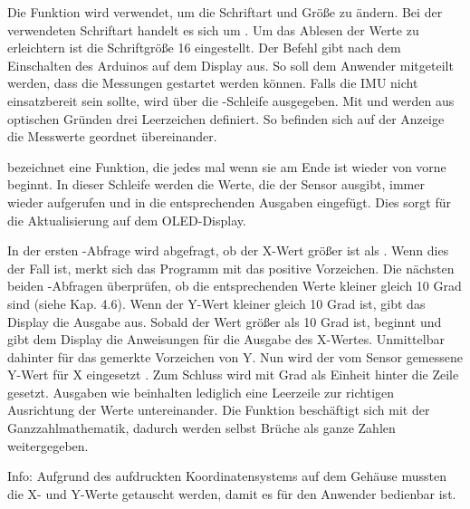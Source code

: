 Die Funktion  wird verwendet, um die Schriftart und Größe zu ändern. Bei der verwendeten Schriftart handelt es sich um . Um das Ablesen der Werte zu erleichtern ist die Schriftgröße 16 eingestellt. Der Befehl  gibt nach dem Einschalten des Arduinos auf dem Display  aus. So soll dem Anwender mitgeteilt werden, dass die Messungen gestartet werden können. Falls die IMU nicht einsatzbereit sein sollte, wird über die -Schleife  ausgegeben. Mit  und  werden aus optischen Gründen drei Leerzeichen definiert. So befinden sich auf der Anzeige die Messwerte geordnet übereinander.



  bezeichnet eine Funktion, die jedes mal wenn sie am Ende ist wieder von vorne beginnt. In dieser Schleife werden die Werte, die der Sensor ausgibt, immer wieder aufgerufen und in die entsprechenden Ausgaben eingefügt. Dies sorgt für die Aktualisierung auf dem OLED-Display. 

In der ersten -Abfrage wird abgefragt, ob der X-Wert größer ist als . Wenn dies der Fall ist, merkt sich das Programm mit  das positive Vorzeichen. Die nächsten beiden -Abfragen überprüfen, ob die entsprechenden Werte kleiner gleich 10 Grad sind (siehe Kap. 4.6). Wenn der Y-Wert kleiner gleich 10 Grad ist, gibt das Display die Ausgabe  aus. Sobald der Wert größer als 10 Grad ist, beginnt  und gibt dem Display die Anweisungen  für die Ausgabe des X-Wertes. Unmittelbar dahinter  für das gemerkte Vorzeichen von Y. Nun wird der vom Sensor gemessene Y-Wert für X eingesetzt . Zum Schluss wird mit  Grad als Einheit hinter die Zeile gesetzt. Ausgaben wie  beinhalten lediglich eine Leerzeile zur richtigen Ausrichtung der Werte untereinander. Die Funktion  beschäftigt sich mit der Ganzzahlmathematik, dadurch werden selbst Brüche als ganze Zahlen weitergegeben. 

\bigskip
   
Info: Aufgrund des aufdruckten Koordinatensystems auf dem Gehäuse mussten die X- und Y-Werte getauscht werden, damit es für den Anwender bedienbar ist.


